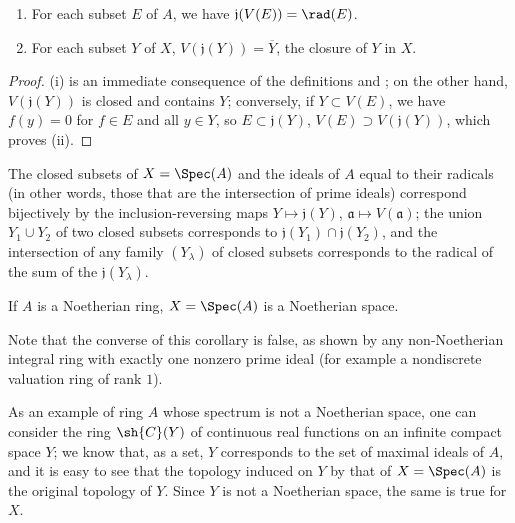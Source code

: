 \begin{proposition}[1.1.4]
\label{I.1.1.4}
\medskip\noindent
\begin{enumerate}
  \item[{\rm(i)}] For each subset $E$ of $A$, we have $\mathfrak{j}(V(E))=\rad(E)$.
  \item[{\rm(ii)}] For each subset $Y$ of $X$, $V(\mathfrak{j}(Y))=\overline{Y}$, the closure of $Y$ in $X$.
\end{enumerate}
\end{proposition}

\begin{proof}
(i) is an immediate consequence of the definitions and ;
on the other hand, $V(\mathfrak{j}(Y))$ is closed and contains $Y$;
conversely, if $Y\subset V(E)$, we have $f(y)=0$ for $f\in E$ and all $y\in Y$, so $E\subset\mathfrak{j}(Y)$, $V(E)\supset V(\mathfrak{j}(Y))$, which proves (ii).
\end{proof}

\begin{corollary}[1.1.5]
\label{I.1.1.5}
The closed subsets of $X=\Spec(A)$ and the ideals of $A$ equal to their radicals (in other words, those that are the intersection of prime ideals) correspond bijectively by the inclusion-reversing maps $Y\mapsto\mathfrak{j}(Y)$, $\mathfrak{a}\mapsto V(\mathfrak{a})$;
the union $Y_1\cup Y_2$ of two closed subsets corresponds to $\mathfrak{j}(Y_1)\cap\mathfrak{j}(Y_2)$, and the intersection of any family $(Y_\lambda)$ of closed subsets corresponds to the radical of the sum of the $\mathfrak{j}(Y_\lambda)$.
\end{corollary}

\begin{corollary}[1.1.6]
\label{I.1.1.6}
If $A$ is a Noetherian ring, $X=\Spec(A)$ is a Noetherian space.
\end{corollary}

Note that the converse of this corollary is false, as shown by any non-Noetherian integral ring with exactly one nonzero prime ideal (for example a nondiscrete valuation ring of rank $1$).

As an example of ring $A$ whose spectrum is not a Noetherian space, one can consider the ring $\sh{C}(Y)$ of continuous real functions on an infinite compact space $Y$;
we know that, as a set, $Y$ corresponds to the set of maximal ideals of $A$, and it is easy to see that the topology induced on $Y$ by that of $X=\Spec(A)$ is the original topology of $Y$.
Since $Y$ is not a Noetherian space, the same is true for $X$.

